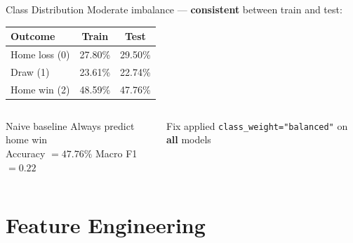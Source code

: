 \documentclass[10pt,aspectratio=169]{beamer}
\begin{document}
\begin{frame}{Class Distribution}
  Moderate imbalance --- \textbf{consistent} between train and test:

  \medskip
  \begin{center}
    \begin{tabular}{lcc}
      \toprule
      \textbf{Outcome} & \textbf{Train} & \textbf{Test} \\
      \midrule
      Home loss (0) & 27.80\% & 29.50\% \\
      Draw (1) & 23.61\% & 22.74\% \\
      \rowcolor{LightBlue}
      Home win (2) & 48.59\% & 47.76\% \\
      \bottomrule
    \end{tabular}
  \end{center}

  \medskip
  \begin{columns}[T]
      \begin{block}{Naive baseline}
        Always predict home win \\
        Accuracy $= 47.76\%$ \quad Macro F1 $= 0.22$
      \end{block}
      \begin{block}{Fix applied}
        \texttt{class\_weight="balanced"} on \textbf{all} models
      \end{block}
  \end{columns}
\end{frame}

\section{Feature Engineering}
\end{document}
